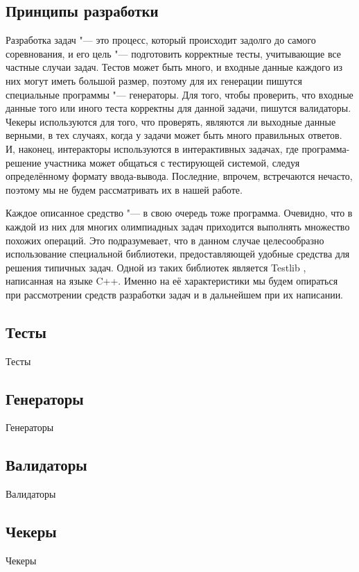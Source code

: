\subsection*{Принципы разработки}

Разработка задач "--- это процесс, который происходит задолго до самого соревнования, и его цель "--- подготовить корректные тесты, учитывающие все частные случаи задач. Тестов может быть много, и входные данные каждого из них могут иметь большой размер, поэтому для их генерации пишутся специальные программы "--- генераторы. Для того, чтобы проверить, что входные данные того или иного теста корректны для данной задачи, пишутся валидаторы. Чекеры используются для того, что проверять, являются ли выходные данные верными, в тех случаях, когда у задачи может быть много правильных ответов. И, наконец, интеракторы используются в интерактивных задачах, где программа-решение участника может общаться с тестирующей системой, следуя определённому формату ввода-вывода. Последние, впрочем, встречаются нечасто, поэтому мы не будем рассматривать их в нашей работе.

Каждое описанное средство "--- в свою очередь тоже программа. Очевидно, что в каждой из них для многих олимпиадных задач приходится выполнять множество похожих операций. Это подразумевает, что в данном случае целесообразно использование специальной библиотеки, предоставляющей удобные средства для решения типичных задач. Одной из таких библиотек является Testlib \cite{testlib}, написанная на языке C++. Именно на её характеристики мы будем опираться при рассмотрении средств разработки задач и в дальнейшем при их написании.

\subsection*{Тесты}

Тесты

\subsection*{Генераторы}

Генераторы

\subsection*{Валидаторы}

Валидаторы

\subsection*{Чекеры}

Чекеры
